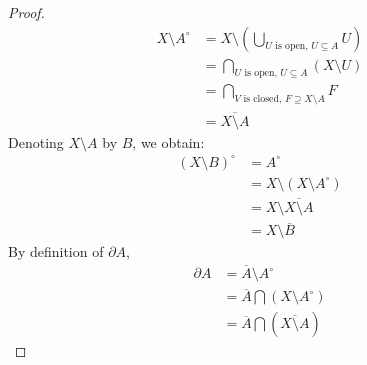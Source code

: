\begin{proof}
\begin{subequations}
\begin{align}
X\setminus A^\circ&=X\setminus\left(\bigcup_{U\text{ is open, } U\subseteq A}U\right)\\
&=\bigcap_{U\text{ is open, }U\subseteq A}(X\setminus U)\\
&=\bigcap_{V\text{ is closed, }F\supseteq X\setminus A}F\\
&=\overline{X\setminus A}
\end{align}
\end{subequations}
Denoting $X\setminus A$ by $B$, we obtain:
\begin{subequations}
\begin{align}
(X\setminus B)^\circ&=A^\circ\\
&=X\setminus(X\setminus A^\circ)\\
&=X\setminus\overline{X\setminus A}\\
&=X\setminus\overline{B}
\end{align}
\end{subequations}
By definition of $\partial A$,
\begin{subequations}
\begin{align}
\partial A&=\overline{A}\setminus A^\circ\\
&=\overline{A}\bigcap(X\setminus A^\circ)\\
&=\overline{A}\bigcap(\overline{X\setminus A})
\end{align}
\end{subequations}
\end{proof}

